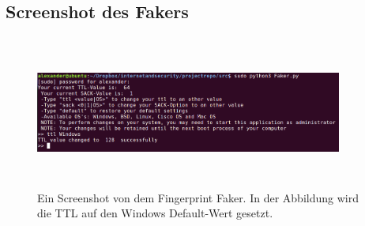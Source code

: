 \documentclass{article} %
\begin{document}
\subsection{Screenshot des Fakers}
\begin{figure}[!htb]
\begin{center}
\includegraphics[width=0.9\textwidth, height=50mm]{data/faker.png}
\captionsetup{singlelinecheck=off}
\caption[Titel]{
Ein Screenshot von dem Fingerprint Faker. In der Abbildung wird die TTL auf den Windows Default-Wert gesetzt.  
}%
\label{Abb.54}
\end{center}
\end{figure}
\end{document}
